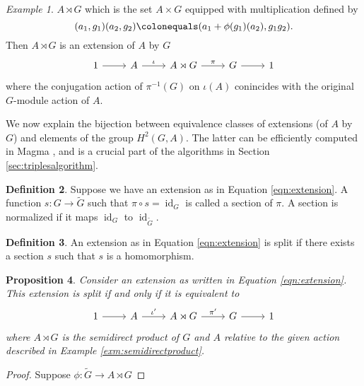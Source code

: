 \documentclass{dcthesis}
\newcommand{\defi}[1]{\textsf{#1}}
\newcommand{\wt}[1]{\widetilde{#1}}
\DeclareMathOperator{\id}{id}
\newtheorem{prop}{Proposition}[section]
\theoremstyle{definition}
\newtheorem{definition}[prop]{Definition}
\theoremstyle{remark}
\newtheorem{example}[prop]{Example}
\numberwithin{equation}{section}
\numberwithin{figure}{section}
\begin{document}
{{\begin{example}
      $A\rtimes G$ which is the set
      $A\times G$ equipped with multiplication
      defined by
      \[
        (a_1,g_1)(a_2,g_2)\colonequals
        (a_1+\phi(g_1)(a_2), g_1g_2).
      \]
      Then $A\rtimes G$
      is an extension of $A$ by $G$
      \[
        \begin{tikzcd}
          1\arrow{r}&A\arrow{r}{\iota}&A\rtimes G\arrow{r}{\pi}&G\arrow{r}&1
        \end{tikzcd}
      \]
      where the conjugation action of $\pi^{-1}(G)$
      on $\iota(A)$
      conincides with the original $G$-module action of $A$.
    \end{example}
    We now explain the bijection between
    equivalence classes of extensions
    (of $A$ by $G$)
    and elements of the group
    $H^2(G,A)$.
    The latter
    can be efficiently computed in \textsf{Magma}
    \cite{magmabook},
    and is a crucial part of the algorithms
    in
    Section \ref{sec:triplesalgorithm}.
    \begin{definition}
      \label{def:section}
      Suppose we have an extension
      as in Equation \ref{eqn:extension}.
      A function $s\colon G\to\wt{G}$
      such that $\pi\circ s = \id_G$
      is called a
      \defi{section}
      of $\pi$.
      A section is
      \defi{normalized}
      if it maps $\id_G$
      to
      $\id_{\wt{G}}$.
    \end{definition}
    \begin{definition}
      \label{def:splitextension}
      An extension as in Equation \ref{eqn:extension}
      is \defi{split}
      if there exists a section $s$ such that
      $s$ is a homomorphism.
    \end{definition}
    \begin{prop}
      \label{prop:splitextensions}
      Consider an extension as written in
      Equation \ref{eqn:extension}.
      This extension is split
      if and only if
      it is equivalent to
      \[
        \begin{tikzcd}
          1\arrow{r}&A\arrow{r}{\iota'}
                    &A\rtimes G\arrow{r}{\pi'}
                    &G\arrow{r}&1
        \end{tikzcd}
      \]
      where $A\rtimes G$ is the semidirect product
      of $G$ and $A$ relative to the given action
      described in
      Example \ref{exm:semidirectproduct}.
    \end{prop}
    \begin{proof}
      Suppose $\phi\colon\wt{G}\to A\rtimes G$

\end{proof}}}
\end{document}
